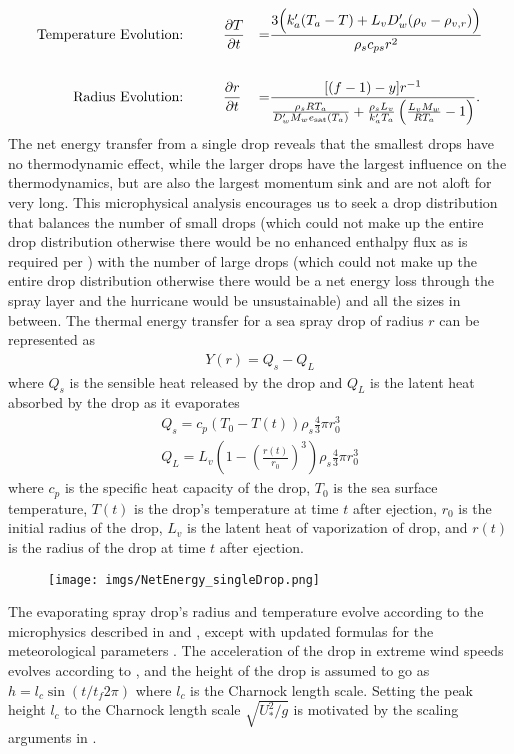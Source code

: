 \documentclass[10pt,a4paper]{article}
\begin{document}
\begin{align*}
\text{Temperature Evolution:}&\hspace*{1cm}\frac{\partial T}{\partial t} &=& \frac{3\Big(k_a'(T_a-T)+L_vD_w'(\rho_v-\rho_{v,r})\Big)}{\rho_sc_{ps}r^2}\\
\vspace*{0.25cm}\\
\text{Radius Evolution:}&\hspace*{1cm}\frac{\partial r}{\partial t} &=& \frac{[(f-1)-y]r^{-1}}{\frac{\rho_sRT_a}{D_w'M_we_{\text{sat}}(T_a)}+\frac{\rho_sL_v}{k_a'T_a}\left(\frac{L_vM_w}{RT_a}-1\right)}.
\end{align*}
The net energy transfer from a single drop reveals that the smallest drops have no thermodynamic effect, while the larger drops have the largest influence on the thermodynamics, but are also the largest momentum sink and are not aloft for very long. This microphysical analysis encourages us to seek a drop distribution that balances the number of small drops (which could not make up the entire drop distribution otherwise there would be no enhanced enthalpy flux as is required per \citep{Andreas2001}) with the number of large drops (which could not make up the entire drop distribution otherwise there would be a net energy loss through the spray layer and the hurricane would be unsustainable) and all the sizes in between. The thermal energy transfer for a sea spray drop of radius $r$ can be represented as
\begin{align}
Y(r) = Q_s - Q_L 
\end{align}
where $Q_s$ is the sensible heat released by the drop and $Q_L$ is the latent heat absorbed by the drop as it evaporates
\begin{align}
Q_s = c_p(T_0-T(t))\rho_s\frac{4}{3}\pi r_0^3\\
Q_L = L_v\left(1-\left(\frac{r(t)}{r_0}\right)^3\right)\rho_s\frac{4}{3}\pi r_0^3
\end{align}
where $c_p$ is the specific heat capacity of the drop, $T_0$ is the sea surface temperature, $T(t)$ is the drop's temperature at time $t$ after ejection, $r_0$ is the initial radius of the drop, $L_v$ is the latent heat of vaporization of drop, and $r(t)$ is the radius of the drop at time $t$ after ejection.\par
\begin{figure}[h!]
\centering
\texttt{[image: imgs/NetEnergy\_singleDrop.png]}
\end{figure}
The evaporating spray drop's radius and temperature evolve according to the microphysics described in \citet{Pruppacher1978} and \citet{Andreas1990}, except with updated formulas for the meteorological parameters \citep{Sharqawy2010,Nayar2016}. The acceleration of the drop in extreme wind speeds evolves according to \citet{Andreas2004}, and the height of the drop is assumed to go as $h = l_c\sin(t/t_f2\pi)$ where $l_c$ is the Charnock length scale. Setting the peak height $l_c$ to the Charnock length scale $\sqrt{U_*^2/g}$ is motivated by the scaling arguments in \citet{Emanuel2003}.
\end{document}
